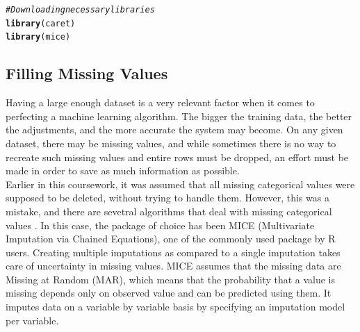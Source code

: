 \documentclass[a4paper,12pt]{article}\usepackage[]{graphicx}\usepackage[]{color}
\makeatletter
\newcommand{\hlcom}[1]{\textcolor[rgb]{0.678,0.584,0.686}{\textit{#1}}}%
\newcommand{\hlstd}[1]{\textcolor[rgb]{0.345,0.345,0.345}{#1}}%
\newcommand{\hlkwd}[1]{\textcolor[rgb]{0.737,0.353,0.396}{\textbf{#1}}}%
\newenvironment{kframe}{%
 \def\at@end@of@kframe{}%
 \ifinner\ifhmode%
  \def\at@end@of@kframe{\end{minipage}}%
  \begin{minipage}{\columnwidth}%
 \fi\fi%
 \def\FrameCommand##1{\hskip\@totalleftmargin \hskip-\fboxsep
 \colorbox{shadecolor}{##1}\hskip-\fboxsep
     \hskip-\linewidth \hskip-\@totalleftmargin \hskip\columnwidth}%
 \MakeFramed {\advance\hsize-\width
   \@totalleftmargin\z@ \linewidth\hsize
   \@setminipage}}%
 {\par\unskip\endMakeFramed%
 \at@end@of@kframe}
\newenvironment{knitrout}{}{} %
\makeatother
\begin{document}
\begin{knitrout}
\color{fgcolor}\begin{kframe}
\begin{alltt}
\hlcom{# Downloading necessary libraries}
\hlkwd{library}\hlstd{(caret)}
\hlkwd{library}\hlstd{(mice)}
\end{alltt}
\end{kframe}
\end{knitrout}

\subsection{Filling Missing Values}\label{filling_missing}
Having a large enough dataset is a very relevant factor when it comes to perfecting a machine learning algorithm. The bigger the training data, the better the adjustments, and the more accurate the system may become. On any given dataset, there may be missing values, and while sometimes there is no way to recreate such missing values and entire rows must be dropped, an effort must be made in order to save as much information as possible.\\
Earlier in this coursework, it was assumed that all missing categorical values were supposed to be deleted, without trying to handle them. However, this was a mistake, and there are sevetral algorithms that deal with missing categorical values \cite{mekala_2019}. In this case, the package of choice has been MICE (Multivariate Imputation via Chained Equations), one of the commonly used package by R users. Creating multiple imputations as compared to a single imputation takes care of uncertainty in missing values. MICE assumes that the missing data are Missing at Random (MAR), which means that the probability that a value is missing depends only on observed value and can be predicted using them. It imputes data on a variable by variable basis by specifying an imputation model per variable.
\end{document}
